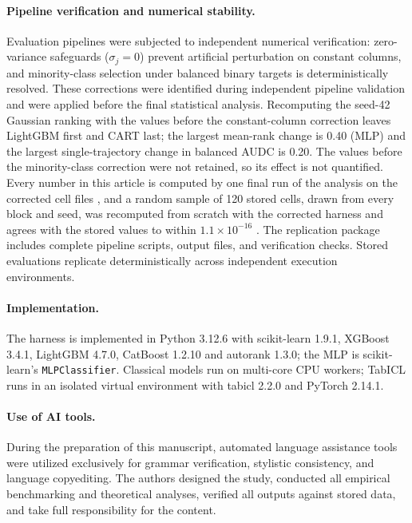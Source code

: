 \documentclass[pdflatex,sn-mathphys]{sn-jnl}
\theoremstyle{thmstyleone}
\theoremstyle{thmstyletwo}
\theoremstyle{thmstylethree}
\begin{document}
\paragraph{Pipeline verification and numerical stability.} Evaluation pipelines were subjected to independent numerical verification: zero-variance safeguards ($\sigma_j=0$) prevent artificial perturbation on constant columns, and minority-class selection under balanced binary targets is deterministically resolved. These corrections were identified during independent pipeline validation and were applied before the final statistical analysis. Recomputing the seed-42 Gaussian ranking with the values before the constant-column correction leaves LightGBM first and CART last; the largest mean-rank change is 0.40 (MLP) and the largest single-trajectory change in balanced AUDC is 0.20. The values before the minority-class correction were not retained, so its effect is not quantified. Every number in this article is computed by one final run of the analysis on the corrected cell files%
, and a random sample of 120 stored cells, drawn from every block and seed, was recomputed from scratch with the corrected harness and agrees with the stored values to within $1.1\times10^{-16}$%
. The replication package includes complete pipeline scripts, output files, and verification checks. Stored evaluations replicate deterministically across independent execution environments.

\paragraph{Implementation.} The harness is implemented in Python 3.12.6 with scikit-learn 1.9.1, XGBoost 3.4.1, LightGBM 4.7.0, CatBoost 1.2.10 and autorank 1.3.0; the MLP is scikit-learn's \texttt{MLPClassifier}. Classical models run on multi-core CPU workers; TabICL runs in an isolated virtual environment with tabicl 2.2.0 and PyTorch 2.14.1.

\paragraph{Use of AI tools.} During the preparation of this manuscript, automated language assistance tools were utilized exclusively for grammar verification, stylistic consistency, and language copyediting. The authors designed the study, conducted all empirical benchmarking and theoretical analyses, verified all outputs against stored data, and take full responsibility for the content.
\end{document}
